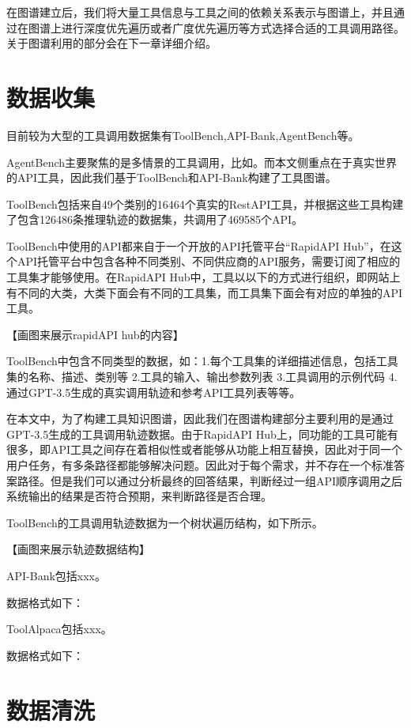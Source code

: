 在图谱建立后，我们将大量工具信息与工具之间的依赖关系表示与图谱上，并且通过在图谱上进行深度优先遍历或者广度优先遍历等方式选择合适的工具调用路径。关于图谱利用的部分会在下一章详细介绍。

\section{数据收集}

目前较为大型的工具调用数据集有ToolBench\cite{Qin2023},API-Bank\cite{Li2023c},AgentBench\cite{Liu2023b}等。

AgentBench主要聚焦的是多情景的工具调用，比如。而本文侧重点在于真实世界的API工具，因此我们基于ToolBench和API-Bank构建了工具图谱。

ToolBench包括来自49个类别的16464个真实的RestAPI工具，并根据这些工具构建了包含126486条推理轨迹的数据集，共调用了469585个API。

ToolBench中使用的API都来自于一个开放的API托管平台“RapidAPI Hub”，在这个API托管平台中包含各种不同类别、不同供应商的API服务，需要订阅了相应的工具集才能够使用。在RapidAPI Hub中，工具以以下的方式进行组织，即网站上有不同的大类，大类下面会有不同的工具集，而工具集下面会有对应的单独的API工具。

【画图来展示rapidAPI hub的内容】

ToolBench中包含不同类型的数据，如：1.每个工具集的详细描述信息，包括工具集的名称、描述、类别等 2.工具的输入、输出参数列表 3.工具调用的示例代码 4.通过GPT-3.5生成的真实调用轨迹和参考API工具列表等等。

在本文中，为了构建工具知识图谱，因此我们在图谱构建部分主要利用的是通过GPT-3.5生成的工具调用轨迹数据。由于RapidAPI Hub上，同功能的工具可能有很多，即API工具之间存在着相似性或者能够从功能上相互替换，因此对于同一个用户任务，有多条路径都能够解决问题。因此对于每个需求，并不存在一个标准答案路径。但是我们可以通过分析最终的回答结果，判断经过一组API顺序调用之后系统输出的结果是否符合预期，来判断路径是否合理。

ToolBench的工具调用轨迹数据为一个树状遍历结构，如下所示。

【画图来展示轨迹数据结构】

API-Bank包括xxx。

数据格式如下：

ToolAlpaca包括xxx。

数据格式如下：

\section{数据清洗}

